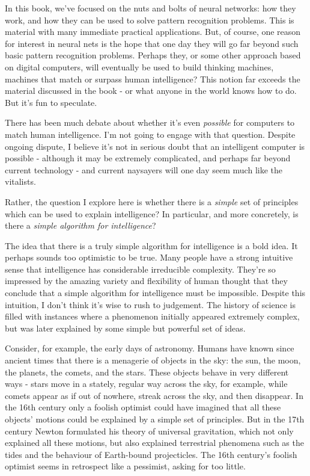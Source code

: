 
In this book, we've focused on the nuts and bolts of neural networks: how they work, and how they can be used to solve pattern recognition problems. This is material with many immediate practical applications. But, of course, one reason for interest in neural nets is the hope that one day they will go far beyond such basic pattern recognition problems. Perhaps they, or some other approach based on digital computers, will eventually be used to build thinking machines, machines that match or surpass human intelligence? This notion far exceeds the material discussed in the book - or what anyone in the world knows how to do. But it's fun to speculate.


There has been much debate about whether it's even \emph{possible} for computers to match human intelligence. I'm not going to engage with that question. Despite ongoing dispute, I believe it's not in serious doubt that an intelligent computer is possible - although it may be extremely complicated, and perhaps far beyond current technology - and current naysayers will one day seem much like the vitalists.


Rather, the question I explore here is whether there is a \emph{simple} set of principles which can be used to explain intelligence? In particular, and more concretely, is there a \emph{simple algorithm for intelligence}?


The idea that there is a truly simple algorithm for intelligence is a bold idea. It perhaps sounds too optimistic to be true. Many people have a strong intuitive sense that intelligence has considerable irreducible complexity. They're so impressed by the amazing variety and flexibility of human thought that they conclude that a simple algorithm for intelligence must be impossible. Despite this intuition, I don't think it's wise to rush to judgement. The history of science is filled with instances where a phenomenon initially appeared extremely complex, but was later explained by some simple but powerful set of ideas.


Consider, for example, the early days of astronomy. Humans have known since ancient times that there is a menagerie of objects in the sky: the sun, the moon, the planets, the comets, and the stars. These objects behave in very different ways - stars move in a stately, regular way across the sky, for example, while comets appear as if out of nowhere, streak across the sky, and then disappear. In the 16th century only a foolish optimist could have imagined that all these objects' motions could be explained by a simple set of principles. But in the 17th century Newton formulated his theory of universal gravitation, which not only explained all these motions, but also explained terrestrial phenomena such as the tides and the behaviour of Earth-bound projecticles. The 16th century's foolish optimist seems in retrospect like a pessimist, asking for too little.


